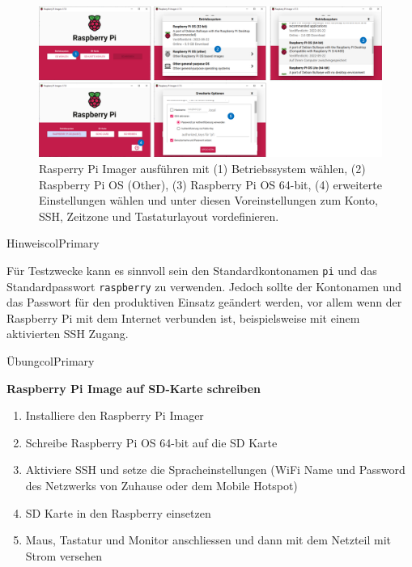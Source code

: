 \documentclass[
  11pt,
  a4paperpaper,
  oneside, openany  ,captions=tableheading
]{scrbook}
\providecommand{\tightlist}{%
  \setlength{\itemsep}{0pt}\setlength{\parskip}{0pt}}
\theoremstyle{definition}
\theoremstyle{remark}
\begin{document}
\begin{figure}[H]

{\centering \includegraphics{images/raspberry_pi_image_schreiben.png}

}

\caption{Rasperry Pi Imager ausführen mit (1) Betriebssystem wählen, (2)
Raspberry Pi OS (Other), (3) Raspberry Pi OS 64-bit, (4) erweiterte
Einstellungen wählen und unter diesen Voreinstellungen zum Konto, SSH,
Zeitzone und Tastaturlayout vordefinieren.}

\end{figure}%

\begin{boxtitle}{Hinweis}{colPrimary}

Für Testzwecke kann es sinnvoll sein den Standardkontonamen \texttt{pi}
und das Standardpasswort \texttt{raspberry} zu verwenden. Jedoch sollte
der Kontonamen und das Passwort für den produktiven Einsatz geändert
werden, vor allem wenn der Raspberry Pi mit dem Internet verbunden ist,
beispielsweise mit einem aktivierten SSH Zugang.

\end{boxtitle}

\begin{boxtitle}{Übung}{colPrimary}

\textbf{Raspberry Pi Image auf SD-Karte schreiben}

\begin{enumerate}
\def\labelenumi{\arabic{enumi}.}
\tightlist
\item
  Installiere den Raspberry Pi Imager
\item
  Schreibe Raspberry Pi OS 64-bit auf die SD Karte
\item
  Aktiviere SSH und setze die Spracheinstellungen (WiFi Name und
  Password des Netzwerks von Zuhause oder dem Mobile Hotspot)
\item
  SD Karte in den Raspberry einsetzen
\item
  Maus, Tastatur und Monitor anschliessen und dann mit dem Netzteil mit
  Strom versehen
\end{enumerate}

\end{boxtitle}
\end{document}
